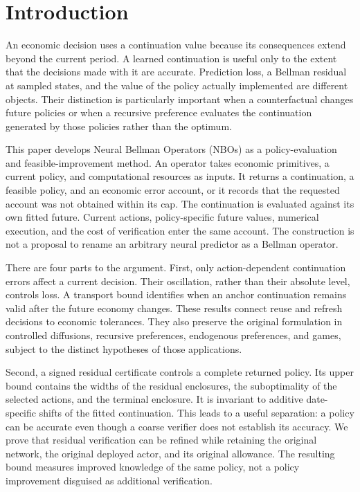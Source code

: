 \documentclass[ecta,nameyear,draft]{econsocart}
\begin{document}
\section{Introduction}\label{sec:introduction}
An economic decision uses a continuation value because its consequences extend beyond the current period. A learned continuation is useful only to the extent that the decisions made with it are accurate. Prediction loss, a Bellman residual at sampled states, and the value of the policy actually implemented are different objects. Their distinction is particularly important when a counterfactual changes future policies or when a recursive preference evaluates the continuation generated by those policies rather than the optimum.

This paper develops Neural Bellman Operators (NBOs) as a policy-evaluation and feasible-improvement method. An operator takes economic primitives, a current policy, and computational resources as inputs. It returns a continuation, a feasible policy, and an economic error account, or it records that the requested account was not obtained within its cap. The continuation is evaluated against its own fitted future. Current actions, policy-specific future values, numerical execution, and the cost of verification enter the same account. The construction is not a proposal to rename an arbitrary neural predictor as a Bellman operator.

There are four parts to the argument. First, only action-dependent continuation errors affect a current decision. Their oscillation, rather than their absolute level, controls loss. A transport bound identifies when an anchor continuation remains valid after the future economy changes. These results connect reuse and refresh decisions to economic tolerances. They also preserve the original formulation in controlled diffusions, recursive preferences, endogenous preferences, and games, subject to the distinct hypotheses of those applications.

Second, a signed residual certificate controls a complete returned policy. Its upper bound contains the widths of the residual enclosures, the suboptimality of the selected actions, and the terminal enclosure. It is invariant to additive date-specific shifts of the fitted continuation. This leads to a useful separation: a policy can be accurate even though a coarse verifier does not establish its accuracy. We prove that residual verification can be refined while retaining the original network, the original deployed actor, and its original allowance. The resulting bound measures improved knowledge of the same policy, not a policy improvement disguised as additional verification.
\end{document}
